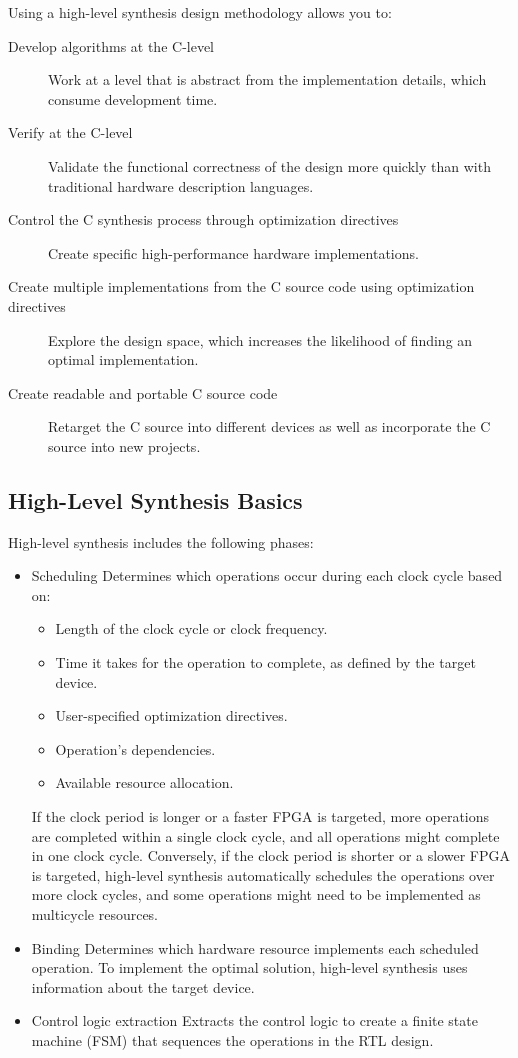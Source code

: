 Using a high-level synthesis design methodology allows you to:
\begin{description}
  \item[Develop algorithms at the C-level] Work at a level that is abstract from the implementation details, which consume development time.
  \item[Verify at the C-level] Validate the functional correctness of the design more quickly than with traditional hardware description languages.
  \item[Control the C synthesis process through optimization directives] Create specific high-performance hardware implementations.
  \item[Create multiple implementations from the C source code using optimization directives] Explore the design space, which increases the likelihood of finding an optimal implementation.
  \item[Create readable and portable C source code] Retarget the C source into different devices as well as incorporate the C source into new projects.
\end{description}

\subsection{High-Level Synthesis Basics}   
High-level synthesis includes the following phases:
\begin{itemize}
  \item Scheduling
    Determines which operations occur during each clock cycle based on:
    \begin{itemize}
      \item Length of the clock cycle or clock frequency.
      \item Time it takes for the operation to complete, as defined by the target device.
      \item User-specified optimization directives.
      \item Operation's dependencies.
      \item Available resource allocation.
    \end{itemize}
    If the clock period is longer or a faster FPGA is targeted, more operations are completed within a single clock cycle, and all operations might complete in one clock cycle. Conversely, if the clock period is shorter or a slower FPGA is targeted, high-level synthesis automatically schedules the operations over more clock cycles, and some operations might need to be  implemented as multicycle resources.
    \item Binding
    Determines which hardware resource implements each scheduled operation. To implement
    the optimal solution, high-level synthesis uses information about the target device.
    \item Control logic extraction
    Extracts the control logic to create a finite state machine (FSM) that sequences the operations
    in the RTL design.
\end{itemize}


